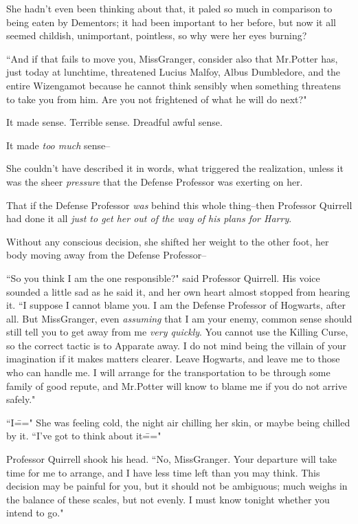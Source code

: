 She hadn't even been thinking about that, it paled so much in comparison to being eaten by Dementors; it had been important to her before, but now it all seemed childish, unimportant, pointless, so why were her eyes burning?

``And if that fails to move you, Miss\?Granger, consider also that Mr.\?Potter has, just today at lunchtime, threatened Lucius Malfoy, Albus Dumbledore, and the entire Wizengamot because he cannot think sensibly when something threatens to take you from him. Are you not frightened of what he will do next?"

It made sense. Terrible sense. Dreadful awful sense.

It made \emph{too much} sense\---

She couldn't have described it in words, what triggered the realization, unless it was the sheer \emph{pressure} that the Defense Professor was exerting on her.

That if the Defense Professor \emph{was} behind this whole thing\---then Professor Quirrell had done it all \emph{just to get her out of the way of his plans for Harry}.

Without any conscious decision, she shifted her weight to the other foot, her body moving away from the Defense Professor\---

``So you think I am the one responsible?" said Professor Quirrell. His voice sounded a little sad as he said it, and her own heart almost stopped from hearing it. ``I suppose I cannot blame you. I am the Defense Professor of Hogwarts, after all. But Miss\?Granger, even \emph{assuming} that I am your enemy, common sense should still tell you to get away from me \emph{very quickly}. You cannot use the Killing Curse, so the correct tactic is to Apparate away. I do not mind being the villain of your imagination if it makes matters clearer. Leave Hogwarts, and leave me to those who can handle me. I will arrange for the transportation to be through some family of good repute, and Mr.\?Potter will know to blame me if you do not arrive safely."

``I\===" She was feeling cold, the night air chilling her skin, or maybe being chilled by it. ``I've got to think about it\==="

Professor Quirrell shook his head. ``No, Miss\?Granger. Your departure will take time for me to arrange, and I have less time left than you may think. This decision may be painful for you, but it should not be ambiguous; much weighs in the balance of these scales, but not evenly. I must know tonight whether you intend to go."

